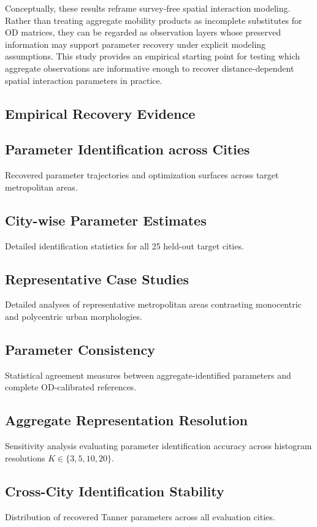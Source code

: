 \documentclass[pdflatex,sn-basic,iicol]{sn-jnl}
\begin{document}
Conceptually, these results reframe survey-free spatial interaction modeling. Rather than treating aggregate mobility products as incomplete substitutes for OD matrices, they can be regarded as observation layers whose preserved information may support parameter recovery under explicit modeling assumptions. This study provides an empirical starting point for testing which aggregate observations are informative enough to recover distance-dependent spatial interaction parameters in practice.

\clearpage
\begin{appendices}

\section{Empirical Recovery Evidence}\label{app:evidence}
\subsection{Parameter Identification across Cities}
Recovered parameter trajectories and optimization surfaces across target metropolitan areas.

\subsection{City-wise Parameter Estimates}
Detailed identification statistics for all 25 held-out target cities.

\subsection{Representative Case Studies}
Detailed analyses of representative metropolitan areas contrasting monocentric and polycentric urban morphologies.

\subsection{Parameter Consistency}
Statistical agreement measures between aggregate-identified parameters and complete OD-calibrated references.

\subsection{Aggregate Representation Resolution}
Sensitivity analysis evaluating parameter identification accuracy across histogram resolutions $K \in \{3, 5, 10, 20\}$.

\subsection{Cross-City Identification Stability}
Distribution of recovered Tanner parameters across all evaluation cities.


\end{appendices}
\end{document}
